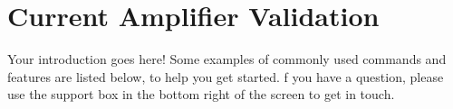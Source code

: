 \section{Current Amplifier Validation}
Your introduction goes here! Some examples of commonly used commands and features are listed below, to help you get started.
f you have a question, please use the support box in the bottom right of the screen to get in touch. 




\begin{versionhistory}
\end{versionhistory}


